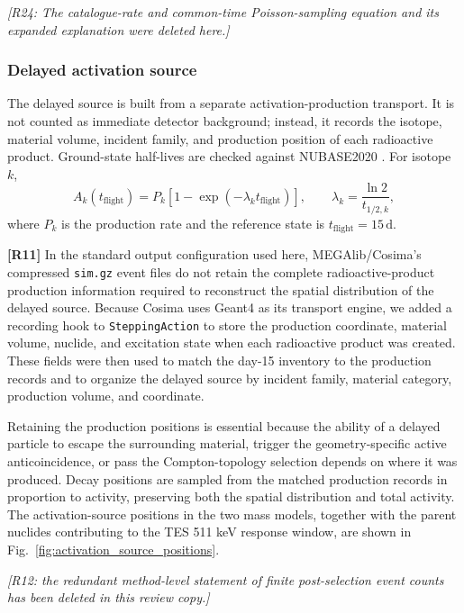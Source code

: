 \documentclass[11pt]{article}
\newcommand{\revdeleted}[1]{\par\noindent\textcolor{revisionblue}{\small\itshape [#1]}\par}
\begin{document}
\revdeleted{R24: The catalogue-rate and common-time Poisson-sampling equation and its expanded explanation were deleted here.}
\endgroup

\subsubsection{Delayed activation source}
\label{subsec:delayed_source}

The delayed source is built from a separate activation-production transport. It
is not counted as immediate detector background; instead, it records the isotope,
material volume, incident family, and production position of each radioactive
product. Ground-state half-lives are checked against NUBASE2020
\cite{Kondev2021NUBASE}. For isotope $k$,
\begin{equation}
  A_k(t_{\mathrm{flight}})=P_k\left[1-\exp(-\lambda_k t_{\mathrm{flight}})\right],
  \qquad \lambda_k=\frac{\ln2}{t_{1/2,k}},
\end{equation}
where $P_k$ is the production rate and the reference state is
$t_{\mathrm{flight}}=15\,\mathrm{d}$.

\begingroup
\color{revisionblue}
\noindent\textbf{[R11]} In the standard output configuration used here,
MEGAlib/Cosima's compressed \texttt{sim.gz} event files do not retain the
complete radioactive-product production information required to reconstruct
the spatial distribution of the delayed source. Because Cosima uses Geant4 as
its transport engine, we added a recording hook to \texttt{SteppingAction} to
store the production coordinate, material volume, nuclide, and excitation
state when each radioactive product was created. These fields were then used
to match the day-15 inventory to the production records and to organize the
delayed source by incident family, material category, production volume, and
coordinate.

Retaining the production positions is essential because the ability of a
delayed particle to escape the surrounding material, trigger the
geometry-specific active anticoincidence, or pass the Compton-topology
selection depends on where it was produced. Decay positions are sampled from
the matched production records in proportion to activity, preserving both the
spatial distribution and total activity. The activation-source positions in
the two mass models, together with the parent nuclides contributing to the TES
511 keV response window, are shown in
Fig.~\ref{fig:activation_source_positions}.
\endgroup

\revdeleted{R12: the redundant method-level statement of finite post-selection event counts has been deleted in this review copy.}
\end{document}
